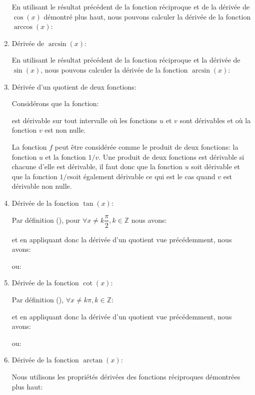 \begin{enumerate}
		 	En utilisant le résultat précédent de la fonction réciproque et de la dérivée de $\cos (x)$  démontré plus haut, nous pouvons calculer la dérivée de la fonction $\arccos (x)$:
		 	
		 	
		 	\item Dérivée de $\arcsin (x)$:
		 
		 	En utilisant le résultat précédent de la fonction réciproque et la dérivée de $\sin (x)$, nous pouvons calculer la dérivée de la fonction $\arcsin (x)$:
		 	
		 	
		 	\item Dérivée d'un quotient de deux fonctions:
		 	
		 	Considérons que la fonction:
		 	
		 	est dérivable sur tout intervalle où les fonctions $u$ et $v$ sont dérivables et où la fonction $v$ est non nulle.
		 	
		 	La fonction $f$ peut être considérée comme le produit de deux fonctions: la fonction $u$ et la fonction $1/v$. Une produit de deux fonctions est dérivable si chacune d'elle est dérivable, il faut donc que la fonction $u$ soit dérivable et que la fonction $1/v$soit également dérivable ce qui est le cas quand $v$ est dérivable non nulle.
		 	
		 	
		 	\item Dérivée de la fonction $\tan(x)$:
		 	
		 	Par définition (), pour $\forall x \neq k\dfrac{\pi}{2},k\in \mathbb{Z}$ nous avons:
		 	
		 	et en appliquant donc la dérivée d'un quotient vue précédemment, nous avons:
		 	
		 	ou:
		 	
		 	
		 	\item Dérivée de la fonction $\cot(x)$:
		 	
		 	Par définition (), $\forall x \neq k\pi,k\in \mathbb{Z}$:
		 	
		 	et en appliquant donc la dérivée d'un quotient vue précédemment, nous avons:
		 	
		 	ou:
		 	
		 	
		 	\item Dérivée de la fonction $\arctan(x)$:
		 	
		 	Nous utilisons les propriétés dérivées des fonctions réciproques démontrées plus haut:
		 	

\end{enumerate}
